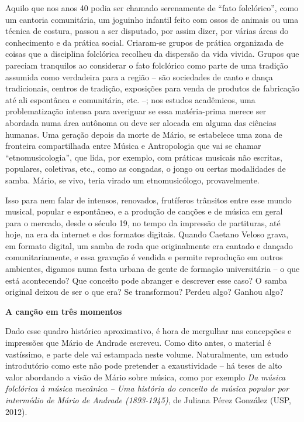 Aquilo que nos anos 40 podia ser chamado serenamente de ``fato
folclórico'', como um cantoria comunitária, um joguinho infantil feito
com ossos de animais ou uma técnica de costura, passou a ser disputado,
por assim dizer, por várias áreas do conhecimento e da prática social.
Criaram-se grupos de prática organizada de coisas que a disciplina
folclórica recolheu da dispersão da vida vivida. Grupos que pareciam
tranquilos ao considerar o fato folclórico como parte de uma tradição
assumida como verdadeira para a região -- são sociedades de canto e
dança tradicionais, centros de tradição, exposições para venda de
produtos de fabricação até ali espontânea e comunitária, etc. --; nos
estudos acadêmicos, uma problematização intensa para averiguar se essa
matéria-prima merece ser abordada numa área autônoma ou deve ser alocada
em alguma das ciências humanas. Uma geração depois da morte de Mário, se
estabelece uma zona de fronteira compartilhada entre Música e
Antropologia que vai se chamar ``etnomusicologia'', que lida, por
exemplo, com práticas musicais não escritas, populares, coletivas, etc.,
como as congadas, o jongo ou certas modalidades de samba. Mário, se
vivo, teria virado um etnomusicólogo, provavelmente.

Isso para nem falar de intensos, renovados, frutíferos trânsitos entre
esse mundo musical, popular e espontâneo, e a produção de canções e de
música em geral para o mercado, desde o século 19, no tempo da impressão
de partituras, até hoje, na era da internet e dos formatos digitais.
Quando Caetano Veloso grava, em formato digital, um samba de roda que
originalmente era cantado e dançado comunitariamente, e essa gravação é
vendida e permite reprodução em outros ambientes, digamos numa festa
urbana de gente de formação universitária -- o que está acontecendo? Que
conceito pode abranger e descrever esse caso? O samba original deixou de
ser o que era? Se transformou? Perdeu algo? Ganhou algo?

\textbf{A canção em três momentos}

Dado esse quadro histórico aproximativo, é hora de mergulhar nas
concepções e impressões que Mário de Andrade escreveu. Como dito antes,
o material é vastíssimo, e parte dele vai estampada neste volume.
Naturalmente, um estudo introdutório como este não pode pretender a
exaustividade -- há teses de alto valor abordando a visão de Mário sobre
música, como por exemplo \emph{Da música folclórica à música mecânica --
Uma história do conceito de música popular por intermédio de Mário de
Andrade (1893-1945)}, de Juliana Pérez González (USP, 2012).

